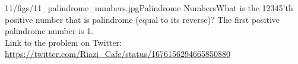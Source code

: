 \begin{problem}{11/figs/11_palindrome_numbers.jpg}{Palindrome Numbers}What is the 12345'th positive number that is palindrome (equal to its reverse)? The first  positive palindrome number is 1.\\[0.2cm]

Link to the problem on Twitter:  \url{https://twitter.com/Riazi_Cafe/status/1676156294665850880}\end{problem}